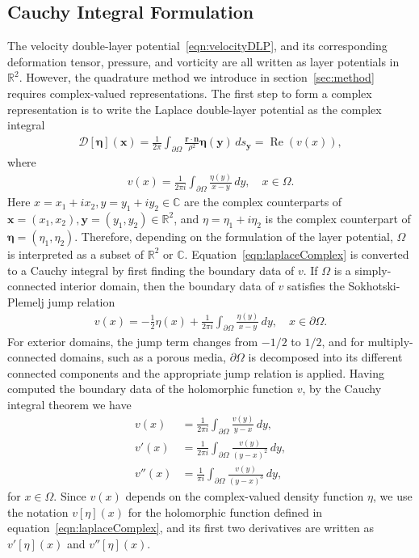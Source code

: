 \documentclass[3p]{elsarticle}
\newcommand{\Real}{\Re}
\newcommand{\bd}{{\partial}}
\newcommand{\CC}{{\mathbb{C}}}
\newcommand{\DD}{{\mathcal{D}}}
\newcommand{\eeta}{{\boldsymbol\eta}}
\newcommand{\nn}{{\mathbf{n}}}
\newcommand{\rr}{{\mathbf{r}}}
\renewcommand{\Re}{{\operatorname{Re}}}
\newcommand{\RR}{{\mathbb{R}}}
\newcommand{\xx}{{\mathbf{x}}}
\newcommand{\yy}{{\mathbf{y}}}
\begin{document}
\subsection{Cauchy Integral Formulation}
\label{sec:DLPcomplex}
The velocity double-layer potential~\eqref{eqn:velocityDLP}, and its
corresponding deformation tensor, pressure, and vorticity are all
written as layer potentials in $\RR^2$.  However, the quadrature method
we introduce in section~\ref{sec:method} requires complex-valued
representations. The first step to form a complex representation is to
write the Laplace double-layer potential as the complex integral
\begin{align}
  \DD[\eeta](\xx) = \frac{1}{2\pi} \int_{\bd\Omega} 
    \frac{\rr \cdot \nn}{\rho^2}\eeta(\yy)\, ds_\yy = \Real (v(x)),
\end{align}
where
\begin{align}
  v(x) = \frac{1}{2\pi i} \int_{\bd\Omega}
    \frac{\eta(y)}{x - y} \, dy, \quad x \in \Omega.
  \label{eqn:laplaceComplex}
\end{align}
Here $x = x_1 + i x_2,y = y_1 + i y_2 \in \CC$ are the complex
counterparts of $\xx = (x_1,x_2),\yy = (y_1,y_2) \in \RR^2$, and $\eta =
\eta_1 + i \eta_2$ is the complex counterpart of $\eeta =
(\eta_1,\eta_2)$. Therefore, depending on the formulation of the layer
potential, $\Omega$ is interpreted as a subset of $\RR^2$ or $\CC$.
Equation~\eqref{eqn:laplaceComplex} is converted to a Cauchy integral by
first finding the boundary data of $v$. If $\Omega$ is a
simply-connected interior domain, then the boundary data of $v$
satisfies the Sokhotski-Plemelj jump relation
\begin{align}
  \label{eqn:SPrelation}
  v(x) = - \frac{1}{2} \eta(x) + \frac{1}{2\pi i} \int_{\bd\Omega}
    \frac{\eta(y)}{x-y}\, dy, \quad x \in \bd\Omega.
\end{align}
For exterior domains, the jump term changes from $-1/2$ to $1/2$, and
for multiply-connected domains, such as a porous media, $\bd\Omega$ is
decomposed into its different connected components and the appropriate
jump relation is applied.  Having computed the boundary data of the
holomorphic function $v$, by the Cauchy integral theorem we have
\begin{subequations}
  \label{eqn:cauchy}
  \begin{alignat}{3}
  v(x) &= \frac{1}{2\pi i}\int_{\bd\Omega} 
    \frac{v(y)}{y-x} \,dy, \\
  v'(x) &= \frac{1}{2\pi i} \int_{\bd\Omega}
    \frac{v(y)}{(y-x)^2} \, dy, \\
  v''(x) &= \frac{1}{\pi i} \int_{\bd\Omega}
    \frac{v(y)}{(y-x)^3} \, dy,
  \end{alignat}
\end{subequations}
for $x \in \Omega$.  Since $v(x)$ depends on the complex-valued density
function $\eta$, we use the notation $v[\eta](x)$ for the holomorphic
function defined in equation~\eqref{eqn:laplaceComplex}, and its first
two derivatives are written as $v'[\eta](x)$ and $v''[\eta](x)$.  
  
\end{document}
